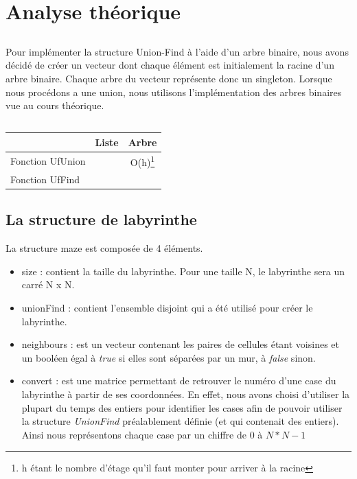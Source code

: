 
\usepackage{clrscode3e}





\section{Analyse théorique}
\subsection{} %
	Pour implémenter la structure Union-Find à l'aide d'un arbre binaire, nous avons décidé de créer un vecteur dont chaque élément est initialement la racine d'un arbre binaire. Chaque arbre du vecteur représente donc un singleton. Lorsque nous procédons a une union, nous utilisons l'implémentation des arbres binaires vue au cours théorique.

\subsection{} %
	\begin{tabular}{|l||c|c|}
	\hline
  & Liste & Arbre\\
  \hline\hline
  Fonction UfUnion & & O(h)\footnote{h étant le nombre d'étage qu'il faut monter pour arriver à la racine} \\
  Fonction UfFind & &
  \\
  \hline
\end{tabular}

\subsection{La structure de labyrinthe} %
La structure maze est composée de 4 éléments.
\begin{itemize}
\item size : contient la taille du labyrinthe. Pour une taille N, le labyrinthe sera un carré N x N.
\item unionFind : contient l'ensemble disjoint qui a été utilisé pour créer le labyrinthe.
\item neighbours : est un vecteur contenant les paires de cellules étant voisines et un booléen égal à \textit{true} si elles sont séparées par un mur, à \textit{false} sinon.
\item convert : est une matrice permettant de retrouver le numéro d'une case du labyrinthe à partir de ses coordonnées.
\bigbreak
En effet, nous avons choisi d'utiliser la plupart du temps des entiers pour identifier les cases afin de pouvoir utiliser la structure \textit{UnionFind} préalablement définie (et qui contenait des entiers). Ainsi nous représentons chaque case par un chiffre de $0$ à $N *N - 1$
\end{itemize}

